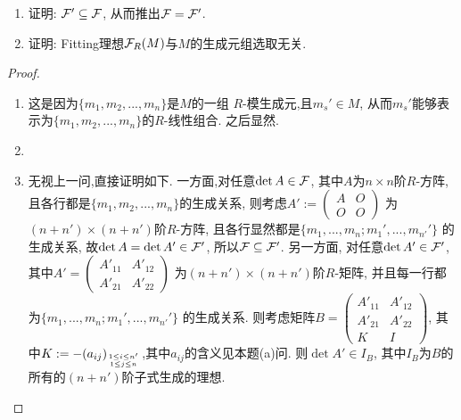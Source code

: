 \documentclass[oneside,a4papar,11pt,UTF8]{book}
\begin{document}
\begin{enumerate}[resume]
\begin{prob}
\begin{enumerate}
      \item 证明: $\mathcal{F}'\subseteq\mathcal{F}$,
      从而推出$\mathcal{F}=\mathcal{F}'$.

      \item 证明: Fitting理想$\mathcal{F}_R(M)$与$M$的生成元组选取无关.
    \end{enumerate}
  \end{prob}

  \begin{proof}\,
    \begin{enumerate}
      \item 这是因为$\{m_1,m_2,...,m_n\}$是$M$的一组
      $R$-模生成元,且$m_s'\in M$,
      从而$m_s'$能够表示为$\{m_1,m_2,...,m_n\}$的$R$-线性组合.
      之后显然.
      \item {}
      \item 无视上一问,直接证明如下.
      一方面,对任意$\det A\in\mathcal{F}$,
      其中$A$为$n\times n$阶$R$-方阵,
      且各行都是$\{m_1,m_2,...,m_n\}$的生成关系,
      则考虑$A':=
      \begin{pmatrix}
        A & O \\
        O & O
      \end{pmatrix}$
      为$(n+n')\times (n+n')$阶$R$-方阵,
      且各行显然都是$\{m_1,...,m_n; m_1',...,m_{n'}'\}$
      的生成关系,
      故$\det A=\det A'\in\mathcal{F}'$,
      所以$\mathcal{F}\subseteq\mathcal{F}'$.
      另一方面,
      对任意$\det A'\in\mathcal{F}'$,
      其中$A'=
      \begin{pmatrix}
        A'_{11} & A'_{12} \\
        A'_{21} & A'_{22}
      \end{pmatrix}$
      为$(n+n')\times(n+n')$阶$R$-矩阵,
      并且每一行都为$\{m_1,...,m_n; m_1',...,m_{n'}'\}$
      的生成关系.
      则考虑矩阵$B=
      \begin{pmatrix}
        A'_{11} & A'_{12} \\
        A'_{21} & A'_{22} \\
        K & I
      \end{pmatrix}$,
      其中$K:=-(a_{ij})_{1\leq i\leq n'\atop 1\leq j\leq n
      }$,其中$a_{ij}$的含义见本题(a)问.
      则$\det A'\in I_B$,
      其中$I_B$为$B$的所有的$(n+n')$阶子式生成的理想.

\end{enumerate}
\end{proof}
\end{enumerate}
\end{document}
